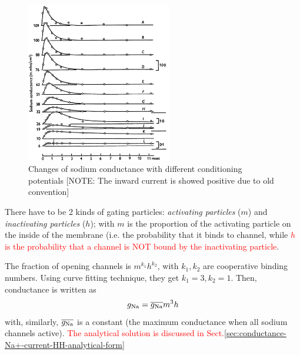 \begin{figure}[htb]
  \centerline{\includegraphics[height=7cm]{./images/sodium-conductance-HH.eps}}
  \caption{Changes of sodium conductance with
  different conditioning potentials [NOTE:
  The inward current is showed positive due
  to old convention]}\label{fig:sodium-conductance-HH}
\end{figure}

There have to be 2 kinds of gating particles:
{\it activating particles} ($m$) and {\it inactivating particles}
($h$); with $m$ is the proportion of the activating particle on the inside
of the membrane (i.e. the probability that it binds to  channel, while
\textcolor{red}{$h$ is the probability that a  channel is NOT
  bound by the inactivating particle}.

The fraction of opening channels is $m^{k_1}h^{k_2}$, with
$k_1,k_2$ are cooperative binding numbers. Using curve fitting
technique, they get $k_1=3,k_2=1$. Then, conductance is written as
\begin{equation}
  \label{eq:157}
  g_{\ce{Na}} = \overline{g_{\ce{Na}}} m^3 h
\end{equation}
with, similarly, $\overline{g_{\ce{Na}}}$ is a constant (the maximum
conductance when all sodium channels active).  \textcolor{red}{The analytical
solution is discussed in
Sect.\ref{sec:conductance-Na+-current-HH-analytical-form}}

